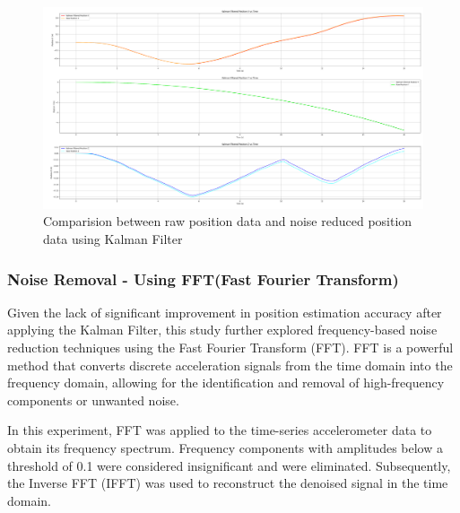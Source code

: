 \documentclass{article}
\begin{document}
\FloatBarrier
\begin{figure}[h]
    \centering
    \includegraphics[width=\textwidth]{2_1_8_3.png}
    \caption{Comparision between raw position data and noise reduced position data using Kalman Filter}
    \label{fig:position_kalman}
\end{figure}

\FloatBarrier
\subsubsection{Noise Removal - Using FFT(Fast Fourier Transform)}
Given the lack of significant improvement in position estimation accuracy after applying the Kalman Filter, this study further explored frequency-based noise reduction techniques using the Fast Fourier Transform (FFT). FFT is a powerful method that converts discrete acceleration signals from the time domain into the frequency domain, allowing for the identification and removal of high-frequency components or unwanted noise.

In this experiment, FFT was applied to the time-series accelerometer data to obtain its frequency spectrum. Frequency components with amplitudes below a threshold of 0.1 were considered insignificant and were eliminated. Subsequently, the Inverse FFT (IFFT) was used to reconstruct the denoised signal in the time domain.
\end{document}
